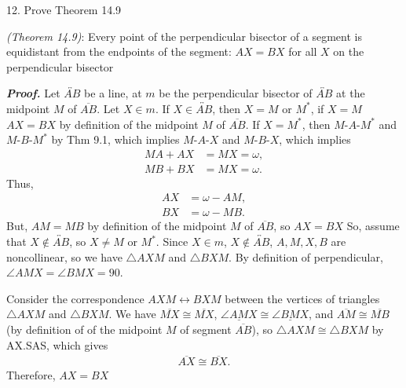\documentclass{report}
\begin{document}
    \bigbreak \noindent 
    \begin{mdframed}
        12. Prove Theorem 14.9
    \end{mdframed}
    \bigbreak \noindent 
    \begin{remark}
        \textit{(Theorem 14.9)}: Every point of the perpendicular bisector of a segment is equidistant from the endpoints of the segment: $AX = BX$ for all $X$ on the perpendicular bisector
    \end{remark}
    \bigbreak \noindent 
    \textbf{\textit{Proof.}} Let $ \overleftrightarrow{AB}$ be a line, at $m$ be the perpendicular bisector of $ \overleftrightarrow{AB}$ at the midpoint $M$ of $\overline{AB}$. Let $X \in m$.
    \bigbreak \noindent 
    If $X \in \overleftrightarrow{AB}$, then $X = M$ or $M^{*}$, if $X = M$ $AX = BX$ by definition of the midpoint $M$ of $\overline{AB}$. If $X = M^{*}$, then $ M\text{-}A\text{-}M^{*}$ and $ M\text{-}B\text{-}M^{*}$ by Thm 9.1, which implies $  M\text{-}A\text{-}X$ and $ M\text{-}B\text{-}X$, which implies
    \begin{align*}
        MA + AX &= MX = \omega, \\
        MB + BX &= MX = \omega
    .\end{align*}
    Thus,
    \begin{align*}
        AX &= \omega - AM, \\
        BX &= \omega - MB
    .\end{align*}
    But, $AM = MB$ by definition of the midpoint $M$ of $\overline{AB}$, so $AX = BX$
    \bigbreak \noindent 
    So, assume that $X \not\in \overleftrightarrow{AB}$, so $X \ne M$ or $M^{*}$.
    \bigbreak \noindent 
    Since $X \in m$, $X \not\in \overleftrightarrow{AB}$, $A,M,X,B$ are noncollinear, so we have $ \triangle AXM$ and $\triangle BXM$. By definition of perpendicular, $ \angle AMX = \angle BMX = 90$.
    \pagebreak \bigbreak \noindent 
    \begin{figure}[ht]
        \centering
        \label{fig:tri}
    \end{figure}
    \bigbreak \noindent 
    Consider the correspondence $AXM \leftrightarrow BXM$ between the vertices of triangles $\triangle AXM$ and $ \triangle BXM$. We have $\overline{MX} \cong \overline{MX}$, $\underline{\angle  AMX} \cong \underline{\angle BMX}$, and $ \overline{AM} \cong \overline{MB}$ (by definition of of the midpoint $M$ of segment $\overline{AB}$), so $ \triangle AXM \cong \triangle BXM$ by AX.SAS, which gives 
    \begin{align*}
        \overline{AX} \cong \overline{BX}
    .\end{align*}
    Therefore, $AX = BX$ \endpf
\end{document}
